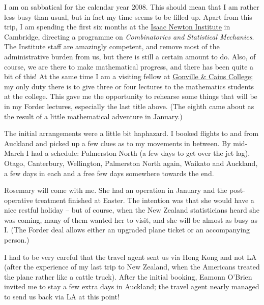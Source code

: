 \documentclass[12pt,a4paper]{article}
\begin{document}
I am on sabbatical for the calendar year 2008. This should mean that I am
rather less busy than usual, but in fact my time seems to be filled up. 
Apart from this trip, I am spending the first six months at the
\href{http://www.newton.cam.ac.uk}{Isaac Newton Institute} in
Cambridge, directing a programme on \textit{Combinatorics and Statistical
Mechanics}. The Institute staff are amazingly competent, and remove
most of the administrative burden from us, but there is still a certain
amount to do. Also, of course, we are there to make mathematical progress,
and there has been quite a bit of this! At the same time I am a visiting
fellow at \href{http://www.cai.cam.ac.uk}{Gonville \& Caius College};
my only duty there is to give three or four lectures to the mathematics
students at the college. This gave me the opportunity to rehearse some
things that will be in my Forder lectures, especially the last title above.
(The eighth came about as the result of a little mathematical adventure in
January.)

The initial arrangements were a little bit haphazard. I booked
flights to and from Auckland and picked up a few clues as to my movements in
between. By mid-March I had a schedule: Palmerston North (a few days to get over
the jet lag), Otago, Canterbury, Wellington, Palmerston North again, Waikato
and Auckland, a few days in each and a free few days somewhere towards the end.

Rosemary will come with me. She had an operation in January and the
post-operative treatment finished at Easter. The intention was that she would
have a nice restful holiday -- but of course, when the New Zealand
statisticians heard she was coming, many of them wanted her to visit, and
she will be almost as busy as I. (The Forder deal allows either an upgraded
plane ticket or an accompanying person.)

I had to be very careful that the travel agent sent us via Hong Kong and
not LA (after the experience of my last trip to New Zealand, when the
Americans treated the plane rather like a cattle truck). After the initial
booking, Eamonn O'Brien invited me to stay a few extra days in Auckland;
the travel agent nearly managed to send us back via LA at this point!
\end{document}
